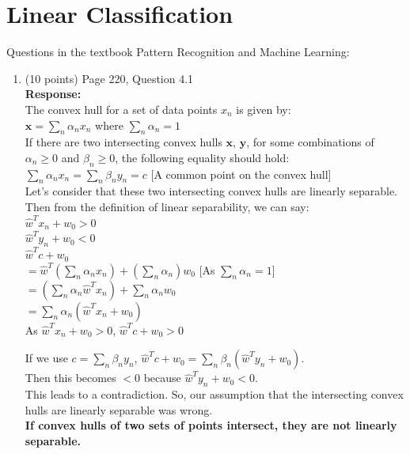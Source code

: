 \documentclass[11pt]{article}
\begin{document}
\section{Linear Classification} 

Questions in the textbook Pattern Recognition and Machine Learning:
\begin{enumerate}
\item (10 points) Page 220, Question 4.1\\
\textbf{Response:}\\
The convex hull for a set of data points ${x_n}$ is given by:\\
$\textbf{x} = \displaystyle \sum_n \alpha_n x_n$ where $\displaystyle \sum_n \alpha_n = 1$\\
If there are two intersecting convex hulls $\textbf{x}$, $\textbf{y}$, for some combinations of $\alpha_n \geq 0$ and $\beta_n \geq 0$, the following equality should hold:\\
$\displaystyle \sum_n \alpha_n x_n = \displaystyle \sum_n \beta_n y_n = c$ [A common point on the convex hull]\\

Let's consider that these two intersecting convex hulls are linearly separable. Then from the definition of linear separability, we can say:\\
$\hat{w}^T x_n + w_0 > 0$\\
$\hat{w}^T y_n + w_0 < 0$\\

$\hat{w}^T c + w_0$\\
$= \displaystyle \hat{w}^T (\sum_n \alpha_n x_n) + (\sum_n \alpha_n) w_0$  [As $\displaystyle \sum_n \alpha_n = 1$]\\
$= \displaystyle(\sum_n \alpha_n \hat{w}^T x_n) + \sum_n \alpha_n w_0$\\
$= \displaystyle \sum_n \alpha_n (\hat{w}^T x_n + w_0)$\\ 
As $\hat{w}^T x_n + w_0 > 0$, $\hat{w}^T c + w_0 > 0$ 

If we use $c = \sum_n \beta_n y_n$, $\hat{w}^T c + w_0 = \displaystyle \sum_n \beta_n (\hat{w}^T y_n + w_0)$.\\
Then this becomes $<0$ because $\hat{w}^T y_n + w_0 < 0$.\\
This leads to a contradiction. So, our assumption that the intersecting convex hulls are linearly separable was wrong.\\
\textbf{If convex hulls of two sets of points intersect, they are not linearly separable.}\\


\end{enumerate}
\end{document}
